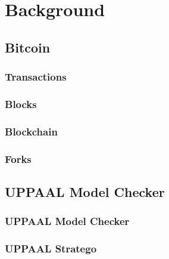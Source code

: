 \chapter{Background}
\label{sec:background}
\minitoc
\vspace*{1cm}

\section{Bitcoin}

\subsection{Transactions}

\subsection{Blocks}

\subsection{Blockchain}

\subsection{Forks}


\section{UPPAAL Model Checker}

\subsection{UPPAAL Model Checker}

\subsection{UPPAAL Stratego}